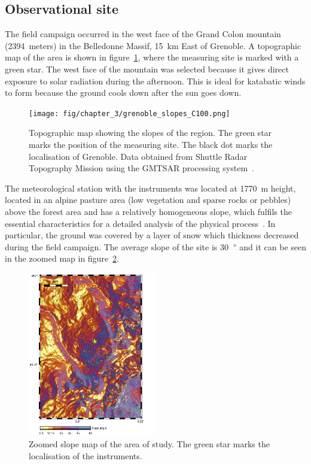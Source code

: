 \subsection{Observational site}

The field campaign occurred in the west face of the Grand Colon mountain (2394~meters) in the Belledonne Massif, 15~km East of Grenoble. A topographic map of the area is shown in figure~\ref{fig:obs_site}, where the measuring site is marked with a green star. The west face of the mountain was selected because it gives direct exposure to solar radiation during the afternoon. This is ideal for katabatic winds to form because the ground cools down after the sun goes down.

\begin{figure}[!ht]
  \begin{center}
  \texttt{[image: fig/chapter\_3/grenoble\_slopes\_C100.png]}
  \caption{Topographic map showing the slopes of the region. The green star marks the position of the measuring site. The black dot marks the localisation of Grenoble. Data obtained from Shuttle Radar Topography Mission using the GMTSAR processing system~\citep{sandwell2011gmtsar}.}
  \label{fig:obs_site}
  \end{center}
\end{figure}

The meteorological station with the instruments was located at 1770~m height, located in an alpine pasture area (low vegetation and sparse rocks or pebbles) above the forest area and
has a relatively homogeneous slope, which fulfils the essential characteristics for a detailed analysis of the physical process~\citep{blein2016observation}. In particular, the ground was covered by a layer of snow which thickness decreased during the field campaign. The average slope of the site is 30~$\degree$ and it can be seen in the zoomed map in figure~\ref{fig:obs_site_zoom}.

\begin{figure}[!ht]
  \begin{center}
  \includegraphics[width=0.5\textwidth]{fig/chapter_3/grenoble_slopes_C100_zoom.png}
  \caption{Zoomed slope map of the area of study. The green star marks the localisation of the instruments.}
  \label{fig:obs_site_zoom}
  \end{center}
\end{figure}

